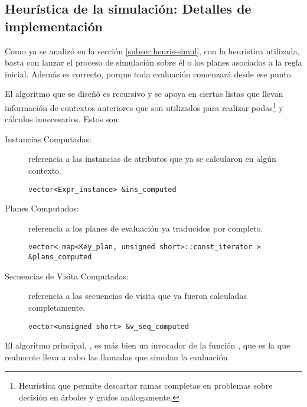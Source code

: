 \subsection{Heurística de la simulación: Detalles de implementación}

Como ya se analizó en la sección \ref{subsec:heuris-simul}, con la heuristica utilizada,  basta con lanzar el proceso de simulación sobre él o los planes asociados a la regla inicial. Además es correcto, porque toda evaluación comenzará desde ese punto.

El algoritmo que se diseñó es recursivo y se apoya en ciertas listas que llevan información de contextos anteriores que son utilizados para realizar podas\footnote{Heurística que permite descartar ramas completas en problemas sobre decisión en árboles y grafos análogamente. } y cálculos innecesarios. Estos son:

\begin{description}
\item [Instancias Computadas:] referencia a las instancias de atributos que ya se calcularon en algún contexto.
\begin{lstlisting}
vector<Expr_instance> &ins_computed
\end{lstlisting}

\item [Planes Computados:] referencia a los planes de evaluación ya traducidos por completo.
\begin{lstlisting}
vector< map<Key_plan, unsigned short>::const_iterator > &plans_computed
\end{lstlisting}

\item [Secuencias de Visita Computadas:] referencia a las secuencias de visita que ya fueron calculadas completamente.
\begin{lstlisting}
vector<unsigned short> &v_seq_computed
\end{lstlisting}
\end{description}

El algoritmo principal, , es más bien un invocador de la función , que es la que realmente lleva a cabo las llamadas que simulan la evaluación.


